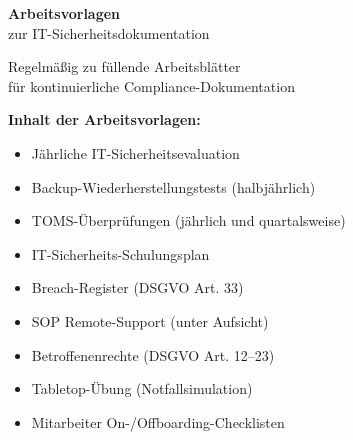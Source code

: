 \documentclass[ngerman,twoside,11pt]{scrartcl}
\begin{document}
\clearpage
\ifaccessible
  \let\cleardoublepage\clearpage
\else
\fi
\thispagestyle{empty}
\begin{center}
  \vspace*{1.2cm}

  \praxislogo[2.5cm]

  {\LARGE\bfseries Arbeitsvorlagen}\\[2mm]
  {\large zur IT-Sicherheitsdokumentation}\\[8mm]
  {\Large \PraxisName}

  \vspace{1.0cm}

  \ifaccessible
    Regelmäßig zu füllende Arbeitsblätter\\
    für kontinuierliche Compliance-Dokumentation

    \textbf{Inhalt der Arbeitsvorlagen:}
    \begin{itemize}
      \item Jährliche IT-Sicherheitsevaluation
      \item Backup-Wiederherstellungstests (halbjährlich)
      \item TOMS-Überprüfungen (jährlich und quartalsweise)
      \item IT-Sicherheits-Schulungsplan
      \item Breach-Register (DSGVO Art. 33)
      \item SOP Remote-Support (unter Aufsicht)
      \item Betroffenenrechte (DSGVO Art. 12--23)
      \item Tabletop-Übung (Notfallsimulation)
      \item Mitarbeiter On-/Offboarding-Checklisten
    \end{itemize}
  \else
\end{center}
\end{document}
